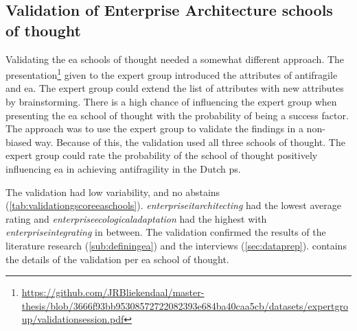 \subsection{Validation of Enterprise Architecture schools of thought}
\label{sub:validationofeaschools}
Validating the \gls{ea} schools of thought needed a somewhat different approach. The presentation\footnote{\url{https://github.com/JRBliekendaal/master-thesis/blob/3666f93bb95308572722082393e684ba40caa5cb/datasets/expertgroup/validationsession.pdf}} given to the expert group introduced the \glspl{attribute} of \gls{antifragile} and \gls{ea}. The expert group could extend the list of \glspl{attribute} with new \glspl{attribute} by brainstorming. There is a high chance of influencing the expert group when presenting the \gls{ea} school of thought with the probability of being a success factor. The approach was to use the expert group to validate the findings in a non-biased way. Because of this, the validation used all three schools of thought. The expert group could rate the probability of the school of thought positively influencing \gls{ea} in achieving \gls{antifragility} in the Dutch \gls{ps}. 

The validation had low variability, and no abstains (\cref{tab:validationgscoreeaschools}). \textit{\gls{enterpriseitarchitecting}} had the lowest average rating and \textit{\gls{enterpriseecologicaladaptation}} had the highest with \textit{\gls{enterpriseintegrating}} in between. The validation confirmed the results of the literature research (\cref{sub:definingea}) and the interviews (\cref{sec:dataprep}).  contains the details of the validation per \gls{ea} school of thought.
\begin{table}[H]
	\centering
	\caption[Validation of Enterprise Architecture schools of thought]{Validation of Enterprise Architecture schools of thought}
	\label{tab:validationgscoreeaschools}
\end{table}%
